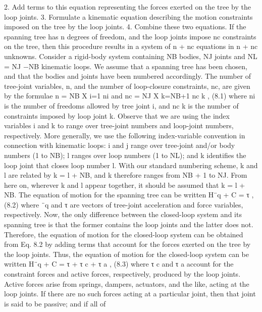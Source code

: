 2. Add terms to this equation representing the forces exerted on the tree by the loop joints. 3. Formulate a kinematic equation describing the motion constraints imposed on the tree by the loop joints. 4. Combine these two equations. If the spanning tree has n degrees of freedom, and the loop joints impose nc constraints on the tree, then this procedure results in a system of n + nc equations in n + nc unknowns. Consider a rigid-body system containing NB bodies, NJ joints and NL = NJ −NB kinematic loops. We assume that a spanning tree has been chosen, and that the bodies and joints have been numbered accordingly. The number of tree-joint variables, n, and the number of loop-closure constraints, nc, are given by the formulae n = NB X i=1 ni and nc = NJ X k=NB+1 nc k , (8.1) where ni is the number of freedoms allowed by tree joint i, and nc k is the number of constraints imposed by loop joint k. Observe that we are using the index variables i and k to range over tree-joint numbers and loop-joint numbers, respectively. More generally, we use the following index-variable convention in connection with kinematic loops: i and j range over tree-joint and/or body numbers (1 to NB); l ranges over loop numbers (1 to NL); and k identifies the loop joint that closes loop number l. With our standard numbering scheme, k and l are related by k = l + NB, and k therefore ranges from NB + 1 to NJ. From here on, wherever k and l appear together, it should be assumed that k = l + NB. The equation of motion for the spanning tree can be written H¨q + C = τ , (8.2) where ¨q and τ are vectors of tree-joint acceleration and force variables, respectively. Now, the only difference between the closed-loop system and its spanning tree is that the former contains the loop joints and the latter does not. Therefore, the equation of motion for the closed-loop system can be obtained from Eq. 8.2 by adding terms that account for the forces exerted on the tree by the loop joints. Thus, the equation of motion for the closed-loop system can be written H¨q + C = τ + τ c + τ a , (8.3) where τ c and τ a account for the constraint forces and active forces, respectively, produced by the loop joints. Active forces arise from springs, dampers, actuators, and the like, acting at the loop joints. If there are no such forces acting at a particular joint, then that joint is said to be passive; and if all of

